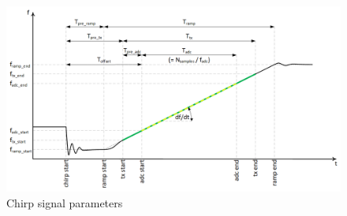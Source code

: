 \begin{figure}[H]
    \centering
    \includegraphics[width=0.85\linewidth]{Src/images/img_chirp_diagram.png}
    \caption{Chirp signal parameters}
    \label{fig:Chirp}
\end{figure}

